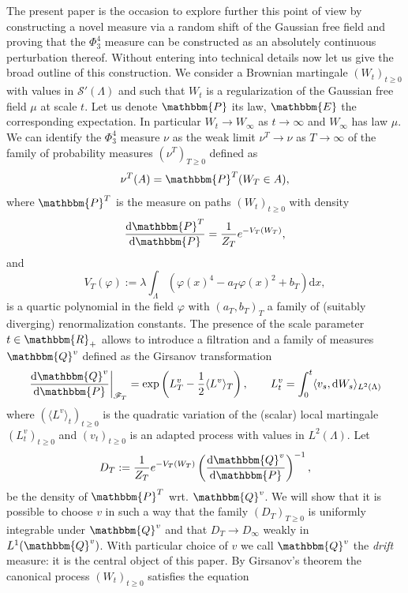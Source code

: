 \documentclass[11pt]{article}
\newcommand{\assign}{:=}
\newcommand{\mathd}{\mathrm{d}}
\newcommand{\tmtextit}[1]{{\itshape{#1}}}
\newcommand{\CF}{\mathscr{F}}
\newcommand{\CS}{\mathscr{S}}
\begin{document}
The present paper is the occasion to explore further this point of view by
constructing a novel measure via a random shift of the Gaussian free field and
proving that the $\Phi^4_3$ measure can be constructed as an absolutely
continuous perturbation thereof. Without entering into technical details now
let us give the broad outline of this construction. We consider a Brownian
martingale $(W_t)_{t \geqslant 0}$ with values in $\CS' (\Lambda)$ and such
that $W_t$ is a regularization of the Gaussian free field $\mu$ at scale $t$.
Let us denote $\mathbbm{P}$ its law, $\mathbbm{E}$ the corresponding
expectation. In particular $W_t \rightarrow W_{\infty}$ as $t \rightarrow
\infty$ and $W_{\infty}$ has law $\mu$. We can identify the $\Phi^4_3$ measure
$\nu$ as the weak limit $\nu^T \rightarrow \nu$ as $T \rightarrow \infty$ of
the family of probability measures $(\nu^T)_{T \geqslant 0}$ defined as
\[ \nu^T (A) =\mathbbm{P}^T (W_T \in A), \]
where $\mathbbm{P}^T$ is the measure on paths $(W_t)_{t \geqslant 0}$ with
density
\[ \frac{\mathd \mathbbm{P}^T}{\mathd \mathbbm{P}} = \frac{1}{Z_T} e^{- V_T
   (W_T)}, \]
and
\[ V_T (\varphi) \assign \lambda \int_{\Lambda} (\varphi (x)^4 - a_T \varphi
   (x)^2 + b_T) \mathd x, \]
is a quartic polynomial in the field $\varphi$ with $(a_T, b_T)_T$ a family of
(suitably diverging) renormalization constants. The presence of the scale
parameter $t \in \mathbbm{R}_+$ allows to introduce a filtration and a family
of measures $\mathbbm{Q}^v$ defined as the Girsanov transformation
\begin{equation}
  \left. \frac{\mathd \mathbbm{Q}^v}{\mathd \mathbbm{P}} \right|_{\CF_T} =
  \exp \left( L_T^v - \frac{1}{2} \langle L^v \rangle_T \right), \qquad L^v_t
  = \int_0^t \langle v_s, \mathd W_s \rangle_{L^2 (\Lambda)} \label{eq:girs}
\end{equation}
where $(\langle L^v \rangle_t)_{t \geqslant 0}$ is the quadratic variation of
the (scalar) local martingale $(L^v_t)_{t \geqslant 0}$ and $(v_t)_{t
\geqslant 0}$ is an adapted process with values in $L^2 (\Lambda)$. Let
\[ D_T \assign \frac{1}{Z_T} e^{- V_T (W_T)} \left( \frac{\mathd
   \mathbbm{Q}^v}{\mathd \mathbbm{P}} \right)^{- 1}, \]
be the density of $\mathbbm{P}^T$ wrt. $\mathbbm{Q}^v$. We will show that it
is possible to choose $v$ in such a way that the family $(D_T)_{T \geqslant
0}$ is uniformly integrable under $\mathbbm{Q}^v$ and that $D_T \rightarrow
D_{\infty}$ weakly in $L^1 (\mathbbm{Q}^v)$. With particular choice of $v$ we
call $\mathbbm{Q}^v$ the \tmtextit{drift} measure: it is the central object of
this paper. By Girsanov's theorem the canonical process $(W_t)_{t \geqslant
0}$ satisfies the equation
\end{document}
